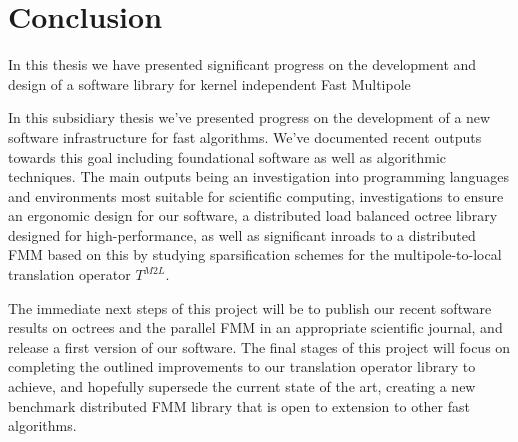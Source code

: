\chapter{Conclusion}\label{chpt:conclusion}


In this thesis we have presented significant progress on the development and design of a software library for kernel independent Fast Multipole

In this subsidiary thesis we've presented progress on the development of a new software infrastructure for fast algorithms. We've documented recent outputs towards this goal including foundational software as well as algorithmic techniques. The main outputs being an investigation into programming languages and environments most suitable for scientific computing, investigations to ensure an ergonomic design for our software, a distributed load balanced octree library designed for high-performance, as well as significant inroads to a distributed FMM based on this by studying sparsification schemes for the multipole-to-local translation operator $T^{M2L}$.

The immediate next steps of this project will be to publish our recent software results on octrees and the parallel FMM in an appropriate scientific journal, and release a first version of our software. The final stages of this project will focus on completing the outlined improvements to our translation operator library to achieve, and hopefully supersede the current state of the art, creating a new benchmark distributed FMM library that is open to extension to other fast algorithms.